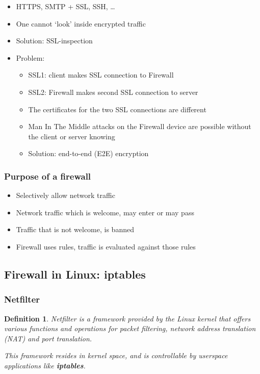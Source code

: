 \documentclass{article}
\newtheorem{theorem}{Definition}[section]
\begin{document}
\begin{itemize}
    \item HTTPS, SMTP + SSL, SSH, \dots
    \item One cannot `look' inside encrypted traffic
    \item Solution: SSL-inspection
    \item Problem:
    \begin{itemize}
        \item SSL1: client makes SSL connection to Firewall
        \item SSL2: Firewall makes second SSL connection to server
        \item The certificates for the two SSL connections are different
        \item Man In The Middle attacks on the Firewall device are possible without the client or server knowing
        \item Solution: end-to-end (E2E) encryption
    \end{itemize}
\end{itemize}

\subsubsection{Purpose of a firewall}

\begin{itemize}
    \item Selectively allow network traffic
    \item Network traffic which is welcome, may enter or may pass
    \item Traffic that is not welcome, is banned
    \item Firewall uses rules, traffic is evaluated against those rules
\end{itemize}

\subsection{Firewall in Linux: iptables}

\subsubsection{Netfilter}

\begin{theorem}
    Netfilter is a framework provided by the Linux kernel that offers
    various functions and operations for packet filtering, network 
    address translation (NAT) and port translation. 

    This framework resides in kernel space, and is controllable by
    userspace applications like \textbf{iptables}.
\end{theorem}
\end{document}
